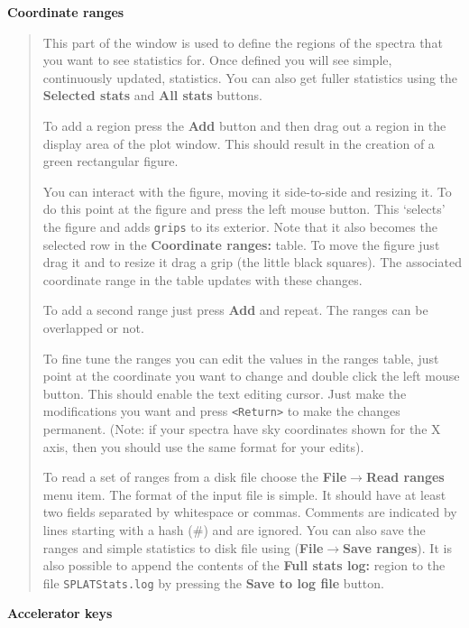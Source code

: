 \documentclass[twoside,11pt]{article}
\newcommand{\latexhtml}[2]{#1}
\renewcommand{\_}{\texttt{\symbol{95}}}
\newcommand{\submenuitem}[2]{\latexhtml{\textbf{#1$\rightarrow$#2}}{\textbf{#1->#2}}}
\newcommand{\labelitem}[1]{\textbf{#1}}
\newcommand{\hitext}[1]{\texttt{#1}}
\newcommand{\subheading}[1]{\textbf{\large{#1}}}
\begin{document}
\subheading{Coordinate ranges}
\begin{quote}
This part of the window is used to define the regions of the spectra
that you want to see statistics for. Once defined you will see simple,
continuously updated, statistics. You can also get fuller statistics using the
\labelitem{Selected stats} and \labelitem{All stats} buttons.

To add a region press the \labelitem{Add} button and then drag out a
region in the display area of the plot window. This should result in
the creation of a green rectangular figure.

You can interact with the figure, moving it side-to-side and resizing it. To
do this point at the figure and press the left mouse button. This `selects'
the figure and adds \hitext{grips} to its exterior. Note that it also becomes
the selected row in the \labelitem{Coordinate ranges:} table. To move the
figure just drag it and to resize it drag a grip (the little black
squares). The associated coordinate range in the table updates with these
changes.

To add a second range just press \labelitem{Add} and repeat. The ranges can be
overlapped or not.

To fine tune the ranges you can edit the values in the ranges table, just
point at the coordinate you want to change and double click the left mouse
button. This should enable the text editing cursor. Just make the
modifications you want and press \hitext{<Return>} to make the changes
permanent. (Note: if your spectra have sky coordinates shown for the X axis,
then you should use the same format for your edits).

To read a set of ranges from a disk file choose the
\submenuitem{File}{Read ranges} menu item.
The format of the input file is simple. It should have at least two fields
separated by whitespace or commas. Comments are indicated by lines starting
with a hash (\#) and are ignored. You can also save the ranges and simple
statistics to disk file using (\submenuitem{File}{Save ranges}). It is also
possible to append the contents of the \labelitem{Full stats log:} region to
the file \hitext{SPLATStats.log} by pressing the \labelitem{Save to log file}
button.
\end{quote}

\subheading{Accelerator keys}
\end{document}
